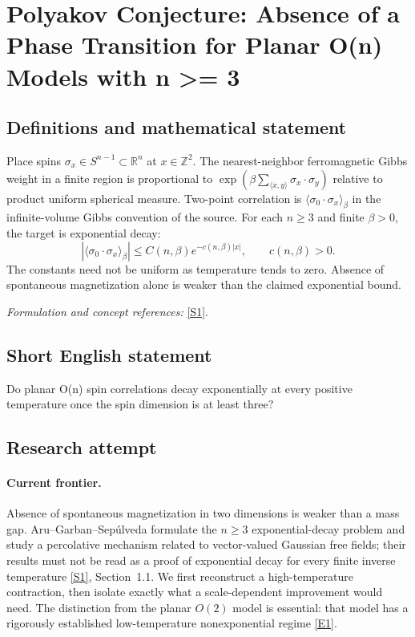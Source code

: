 \documentclass[11pt,a4paper]{article}
\newcommand{\Z}{\mathbb{Z}}
\newcommand{\R}{\mathbb{R}}
\newcommand{\sref}[2]{\hyperlink{source:#1:#2}{[S#2]}}
\newcommand{\eref}[2]{\hyperlink{extra:#1:#2}{[E#2]}}
\newif\ifshowcatalogue
\newcommand{\cataloguescope}[1]{\ifshowcatalogue
 \paragraph{Exact scope in the supplied catalogue.}
 \begin{quote}\small #1\end{quote}\fi}
\numberwithin{equation}{section}
\begin{document}
\setcounter{section}{0}
\clearpage
\section*{\texorpdfstring{Polyakov Conjecture: Absence of a Phase Transition for Planar O(n) Models with n >= 3}{Polyakov Conjecture: Absence of a Phase Transition for Planar O(n) Models with n >= 3}}\label{30006780}
\subsection{Definitions and mathematical statement}
Place spins $\sigma_x\in S^{n-1}\subset\R^n$ at $x\in\Z^2$. The nearest-neighbor ferromagnetic Gibbs weight in a finite region is proportional to
$\exp(\beta\sum_{\langle x,y\rangle}\sigma_x\cdot\sigma_y)$ relative to product uniform spherical measure. Two-point correlation is $\langle\sigma_0\cdot\sigma_x\rangle_\beta$ in the infinite-volume Gibbs convention of the source. For each $n\ge3$ and finite $\beta>0$, the target is exponential decay:
\[
 |\langle\sigma_0\cdot\sigma_x\rangle_\beta|\le C(n,\beta)e^{-c(n,\beta)|x|},
 \qquad c(n,\beta)>0.
\]
The constants need not be uniform as temperature tends to zero. Absence of spontaneous magnetization alone is weaker than the claimed exponential bound.
\par\smallskip\textit{Formulation and concept references:} \sref{30006780}{1}.
\cataloguescope{For every integer n >= 3 and every finite inverse temperature beta > 0, prove that two-point correlations in the nearest-neighbor O(n) spin model on Z\textasciicircum{}2 decay exponentially with distance.}
\subsection{Short English statement}
Do planar O(n) spin correlations decay exponentially at every positive temperature once the spin dimension is at least three?
\subsection{Research attempt}

\paragraph{Current frontier.}
Absence of spontaneous magnetization in two dimensions is weaker than a mass gap. Aru--Garban--Sep\'ulveda formulate the $n\ge3$ exponential-decay problem and study a percolative mechanism related to vector-valued Gaussian free fields; their results must not be read as a proof of exponential decay for every finite inverse temperature \sref{30006780}{1}, Section~1.1. We first reconstruct a high-temperature contraction, then isolate exactly what a scale-dependent improvement would need. The distinction from the planar $O(2)$ model is essential: that model has a rigorously established low-temperature nonexponential regime \eref{30006780}{1}.
\end{document}
